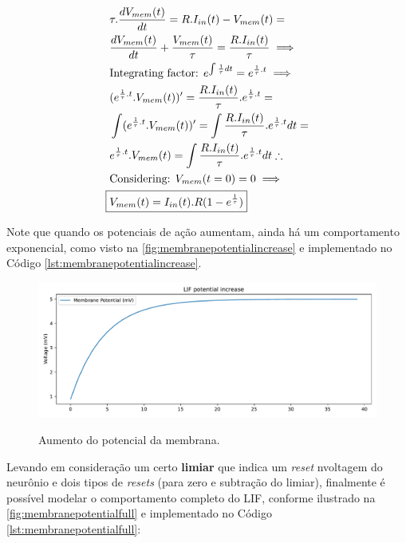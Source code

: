 			\begin{equation}
				\label{eq:actionpotincrease}
				\begin{aligned}
					&\tau.\dfrac{dV_{mem}(t)}{dt} = R.I_{in}(t) - V_{mem}(t) = \\
					&\dfrac{dV_{mem}(t)}{dt} + \frac{V_{mem}(t)}{\tau} = \frac{R.I_{in}(t)}{\tau} \implies \\
					&\text{Integrating factor: } e^{\int \frac{1}{\tau} dt} = e^{\frac{1}{\tau}.t} \implies \\
					&(e^{\frac{1}{\tau}.t}.V_{mem}(t))' = \frac{R.I_{in}(t)}{\tau}.e^{\frac{1}{\tau}.t} = \\
					&\int (e^{\frac{1}{\tau}.t}.V_{mem}(t))' = \int \frac{R.I_{in}(t)}{\tau}.e^{\frac{1}{\tau}.t} dt = \\
					&e^{\frac{1}{\tau}.t}.V_{mem}(t) = \int \frac{R.I_{in}(t)}{\tau}.e^{\frac{1}{\tau}.t} dt \therefore \\
					& \text{Considering: } V_{mem}(t=0) = 0 \implies \\
					\Aboxed{&V_{mem}(t) = I_{in}(t).R(1-e^{\frac{1}{\tau}})}
				\end{aligned}
			\end{equation}
			
			\par Note que quando os potenciais de ação aumentam, ainda há um comportamento exponencial, como visto na  \autoref{fig:membranepotentialincrease} e implementado no Código \autoref{lst:membranepotentialincrease}.
			
			
			
			\begin{figure}[H]
				\centering
				\caption{Aumento do potencial da membrana.}
				\includegraphics[width=.7\linewidth]{images/membranePotentialIncrease}
				\label{fig:membranepotentialincrease}
			\end{figure}
			
			\par Levando em consideração um certo \textbf{limiar} que indica um \textit{reset} nvoltagem do neurônio e dois tipos de \textit{resets} (para zero e subtração do limiar), finalmente é possível modelar o comportamento completo do LIF, conforme ilustrado na  \autoref{fig:membranepotentialfull} e implementado no Código \autoref{lst:membranepotentialfull}:
			
